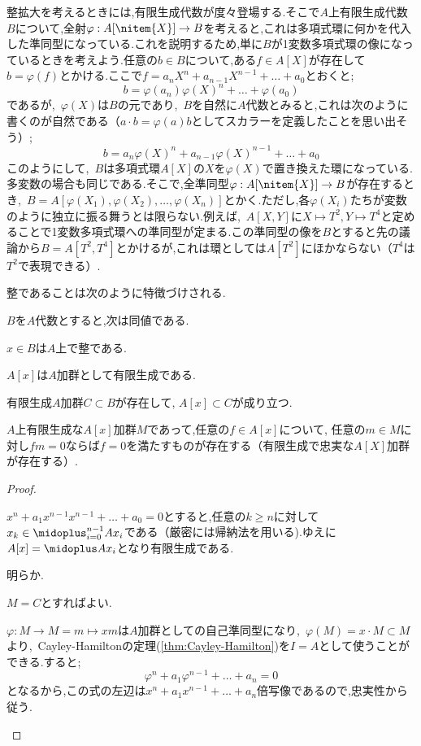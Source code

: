 整拡大を考えるときには,有限生成代数が度々登場する.そこで$A$上有限生成代数$B$について,全射$\varphi:A[\nitem{X}]\to B$を考えると,これは多項式環に何かを代入した準同型になっている.これを説明するため,単に$B$が1変数多項式環の像になっているときを考えよう.任意の$b\in B$について,ある$f\in A[X]$が存在して$b=\varphi(f)$とかける.ここで$f=a_nX^n+a_{n-1}X^{n-1}+\dots+a_0$とおくと;
\[b=\varphi(a_n)\varphi(X)^n+\dots+\varphi(a_0)\]
であるが,~$\varphi(X)$は$B$の元であり,~$B$を自然に$A$代数とみると,これは次のように書くのが自然である（$a\cdot b=\varphi(a)b$としてスカラーを定義したことを思い出そう）;
\[b=a_n\varphi(X)^n+a_{n-1}\varphi(X)^{n-1}+\dots+a_0\]
このようにして,~$B$は多項式環$A[X]$の$X$を$\varphi(X)$で置き換えた環になっている.多変数の場合も同じである.そこで,全準同型$\varphi:A[\nitem{X}]\to B$が存在するとき,~$B=A[\varphi(X_1),\varphi(X_2),\dots,\varphi(X_n)]$とかく.ただし,各$\varphi(X_i)$たちが変数のように独立に振る舞うとは限らない.例えば,~$A[X,Y]$に$X\mapsto T^2,Y\mapsto T^4$と定めることで1変数多項式環への準同型が定まる.この準同型の像を$B$とすると先の議論から$B=A[T^2,T^4]$とかけるが,これは環としては$A[T^2]$にほかならない（$T^4$は$T^2$で表現できる）.

整であることは次のように特徴づけされる.
\begin{prop}\label{prop:整拡大の特徴づけ}
	$B$を$A$代数とすると,次は同値である.
	\begin{sakura}
		\item	$x\in B$は$A$上で整である.
		\item	$A[x]$は$A$加群として有限生成である.
		\item	有限生成$A$加群$C\subset B$が存在して, $A[x]\subset C$が成り立つ.
		\item	$A$上有限生成な$A[x]$加群$M$であって,任意の$f\in A[x]$について, 任意の$m\in M$に対し$fm=0$ならば$f=0$を満たすものが存在する（有限生成で忠実な$A[X]$加群が存在する）.
	\end{sakura}
\end{prop}
\begin{proof}
	\begin{eqv}[4]
		\item $x^n+a_1x^{n-1}x^{n-1}+\dots+a_0=0$とすると,任意の$k\geq n$に対して$x_k\in \midoplus_{i=0}^{n-1}Ax_i$である（厳密には帰納法を用いる).ゆえに$A[x]=\midoplus Ax_i$となり有限生成である.
		
		\item 明らか. 
		\item $M=C$とすればよい.
		\item $\varphi:M\to M=m\mapsto xm$は$A$加群としての自己準同型になり,~$\varphi(M)=x\cdot M\subset M$より,~Cayley-Hamiltonの定理(\ref{thm:Cayley-Hamilton})を$I=A$として使うことができる.すると;
		\[\varphi^n+a_1\varphi^{n-1}+\dots+a_n=0\]
		となるから,この式の左辺は$x^n+a_1x^{n-1}+\dots+a_n$倍写像であるので,忠実性から従う.
	\end{eqv}
\end{proof}

